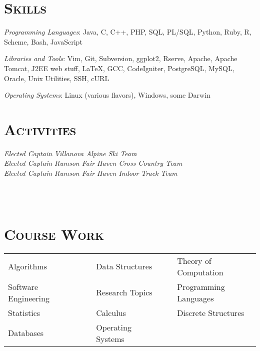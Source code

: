 \begin{resume}

\section{\textsc{Skills}}

\emph{Programming Languages}: Java, C, C++, PHP, SQL, PL/SQL, Python, Ruby, R,
Scheme, Bash, JavaScript

\emph{Libraries and Tools}: Vim, Git, Subversion, ggplot2, Rserve, Apache,
Apache Tomcat, J2EE web stuff, LaTeX, GCC, CodeIgniter, PostgreSQL, MySQL,
Oracle, Unix Utilities, SSH, cURL

\emph{Operating Systems}: Linux (various flavors), Windows, some Darwin


\section{\textsc{Activities}}

\emph{Elected Captain Villanova Alpine Ski Team} \\
\emph{Elected Captain Rumson Fair-Haven Cross Country Team} \\
\emph{Elected Captain Rumson Fair-Haven Indoor Track Team} \\

\begin{formatb}
  \\
  \body\\
\end{formatb}



\section{\textsc{Course Work}}
  \begin{tabular}{lllll}

  Algorithms             & \ \ & Data Structures     & \ \ & Theory of Computation \\
  Software Engineering   & \ \ & Research Topics     & \ \ & Programming Languages \\
  Statistics             & \ \ & Calculus            & \ \ & Discrete Structures \\
  Databases              & \ \ & Operating Systems   & \ \ & 

  \end{tabular}

\end{resume}

